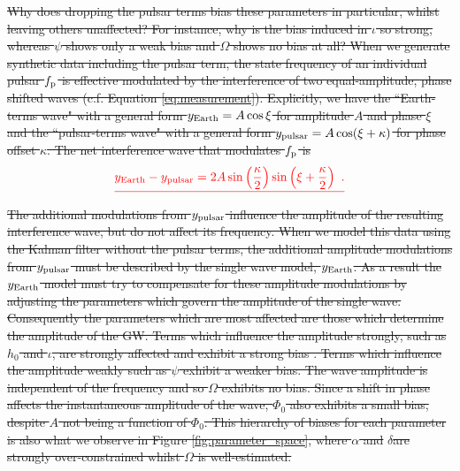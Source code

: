 \documentclass[fleqn,usenatbib,useAMS]{mnras}
\providecommand{\DIFadd}[1]{{\protect\color{blue}\uwave{#1}}} %
\providecommand{\DIFdel}[1]{{\protect\color{red}\sout{#1}}}                      %
\providecommand{\DIFaddbegin}{} %
\providecommand{\DIFaddend}{} %
\providecommand{\DIFdelbegin}{} %
\providecommand{\DIFdelend}{} %
\newcommand{\DIFscaledelfig}{0.5}
\newlength{\DIFdelgraphicswidth} %
\newlength{\DIFdelgraphicsheight} %
\newcommand{\DIFaddincludegraphics}[2][]{{\color{blue}\fbox{\DIFOincludegraphics[#1]{#2}}}} %
\newcommand{\DIFdelincludegraphics}[2][]{%
\sbox{\DIFdelgraphicsbox}{\DIFOincludegraphics[#1]{#2}}%
\settoboxwidth{\DIFdelgraphicswidth}{\DIFdelgraphicsbox} %
\settoboxtotalheight{\DIFdelgraphicsheight}{\DIFdelgraphicsbox} %
\scalebox{\DIFscaledelfig}{%
\parbox[b]{\DIFdelgraphicswidth}{\usebox{\DIFdelgraphicsbox}\\[-\baselineskip] \rule{\DIFdelgraphicswidth}{0em}}\llap{\resizebox{\DIFdelgraphicswidth}{\DIFdelgraphicsheight}{%
\setlength{\unitlength}{\DIFdelgraphicswidth}%
\begin{picture}(1,1)%
\thicklines\linethickness{2pt} %
{\color[rgb]{1,0,0}\put(0,0){\framebox(1,1){}}}%
{\color[rgb]{1,0,0}\put(0,0){\line( 1,1){1}}}%
{\color[rgb]{1,0,0}\put(0,1){\line(1,-1){1}}}%
\end{picture}%
}\hspace*{3pt}}} %
} %
\DeclareRobustCommand{\DIFaddbegin}{\DIFOaddbegin \let\includegraphics\DIFaddincludegraphics} %
\DeclareRobustCommand{\DIFaddend}{\DIFOaddend \let\includegraphics\DIFOincludegraphics} %
\DeclareRobustCommand{\DIFdelbegin}{\DIFOdelbegin \let\includegraphics\DIFdelincludegraphics} %
\DeclareRobustCommand{\DIFdelend}{\DIFOaddend \let\includegraphics\DIFOincludegraphics} %
\begin{document}
\DIFdel{Why does dropping the pulsar terms bias these parameters in particular, whilst leaving others unaffected? For instance, why is the bias induced in $\iota$ so strong, whereas $\psi$ shows only a weak bias and  $\Omega$ shows no bias at all? When we generate synthetic data including the pulsar term, the state frequency of an individual pulsar $f_{\rm p}$ is effective modulated by the interference of two equal-amplitude, phase shifted waves (c.f. Equation \ref{eq:measurement}). Explicitly, we have the ``Earth-terms wave"	 with a general form $y_{\rm Earth} = A \cos \xi$ for amplitude $A$ and phase $\xi$ and the ``pulsar-terms wave" with a general form $y_{\rm pulsar} = A \cos (\xi + \kappa)$ for phase offset $\kappa$. The net interference wave that modulates $f_{\rm p}$ is 
}\begin{eqnarray*}
	\DIFdel{y_{\rm Earth} - y_{\rm pulsar} = 2 A \sin \left(\frac{\kappa}{2}\right) \sin \left(\xi + \frac{\kappa}{2}\right) \ .
}\end{eqnarray*}%
\DIFdel{The additional modulations from $y_{\rm pulsar}$ influence the amplitude of the resulting interference wave, but do not affect its frequency. When we model this data using the Kalman filter without the pulsar terms, the additional amplitude modulations from $y_{\rm pulsar}$ must be described by the single wave model, $y_{\rm Earth}$. As a result the $y_{\rm Earth}$ model must try to compensate for these amplitude modulations by adjusting the parameters which govern the amplitude of the single wave. Consequently the parameters which are most affected are those which determine the amplitude of the GW. Terms which influence the amplitude strongly, such as $h_0$ and $\iota$, are strongly affected and exhibit a strong bias . Terms which influence the amplitude weakly such as $\psi$ exhibit a weaker bias. The wave amplitude is independent of the frequency and so $\Omega$ exhibits no bias. Since a shift in phase affects the instantaneous amplitude of the wave, $\Phi_0$ also exhibits a small bias, despite $A$ not being a function of $\Phi_0$. This hierarchy of biases for each parameter is also what we observe in Figure \ref{fig:parameter_space}, where $\alpha$ and }\DIFdelend \DIFaddbegin \DIFadd{obtained for other parameters, e.g. }\DIFaddend $\delta$\DIFdelbegin \DIFdel{are strongly over-constrained whilst $\Omega$ is well-estimated. }%
\end{document}
